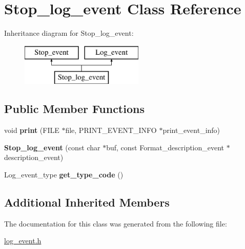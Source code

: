\hypertarget{classStop__log__event}{}\section{Stop\+\_\+log\+\_\+event Class Reference}
\label{classStop__log__event}
Inheritance diagram for Stop\+\_\+log\+\_\+event\+:\begin{figure}[H]
\begin{center}
\leavevmode
\includegraphics[height=2.000000cm]{classStop__log__event}
\end{center}
\end{figure}
\subsection*{Public Member Functions}
\begin{DoxyCompactItemize}
\item 
\mbox{\label{classStop__log__event_ae23907841c403f09c445d0a7e48f3af5}} 
void {\bfseries print} (F\+I\+LE $\ast$file, P\+R\+I\+N\+T\+\_\+\+E\+V\+E\+N\+T\+\_\+\+I\+N\+FO $\ast$print\+\_\+event\+\_\+info)
\item 
\mbox{\label{classStop__log__event_abed6775ea8172718b09b7a5a4890ace9}} 
{\bfseries Stop\+\_\+log\+\_\+event} (const char $\ast$buf, const Format\+\_\+description\+\_\+event $\ast$description\+\_\+event)
\item 
\mbox{\label{classStop__log__event_afb28e84af6e0828977e78453a6aef282}} 
Log\+\_\+event\+\_\+type {\bfseries get\+\_\+type\+\_\+code} ()
\end{DoxyCompactItemize}
\subsection*{Additional Inherited Members}


The documentation for this class was generated from the following file\+:\begin{DoxyCompactItemize}
\item 
\mbox{\hyperlink{log__event_8h}{log\+\_\+event.\+h}}\end{DoxyCompactItemize}
